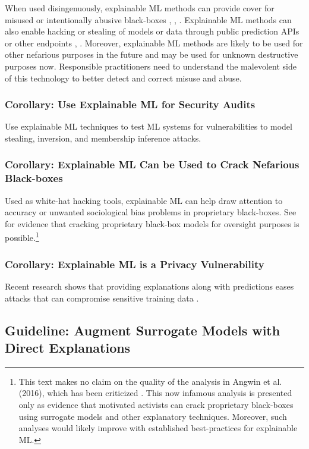 \documentclass{article}
\begin{document}
When used disingenuously, explainable ML methods can provide cover for misused or intentionally abusive black-boxes \cite{fair_washing}, \cite{please_stop}, \cite{scaffolding}. Explainable ML methods can also enable hacking or stealing of models or data through public prediction APIs or other endpoints \cite{membership_inference}, \cite{model_stealing}. Moreover, explainable ML methods are likely to be used for other nefarious purposes in the future and may be used for unknown destructive purposes now. Responsible practitioners need to understand the malevolent side of this technology to better detect and correct misuse and abuse.

\subsubsection{Corollary: Use Explainable ML for Security Audits} Use explainable ML techniques to test ML systems for vulnerabilities to model stealing, inversion, and membership inference attacks.

\subsubsection{Corollary: Explainable ML Can be Used to Crack Nefarious Black-boxes} Used as white-hat hacking tools, explainable ML can help draw attention to accuracy or unwanted sociological bias problems in proprietary black-boxes. See \citet{angwin16} for evidence that cracking proprietary black-box models for oversight purposes is possible.\footnote{\scriptsize{This text makes no claim on the quality of the analysis in Angwin et al. (2016), which has been criticized \cite{flores2016false}. This now infamous analysis is presented only as evidence that motivated activists can crack proprietary black-boxes using surrogate models and other explanatory techniques. Moreover, such analyses would likely improve with established best-practices for explainable ML.}}

\subsubsection{Corollary: Explainable ML is a Privacy Vulnerability} Recent research shows that providing explanations along with predictions eases attacks that can compromise sensitive training data \cite{shokri2019privacy}.

\subsection{Guideline: Augment Surrogate Models with Direct Explanations}
\end{document}
